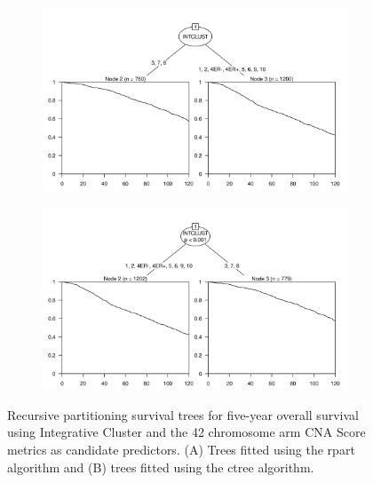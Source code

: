 \begin{figure}[!htb]
\centering

\vspace{0.5cm}

\begin{subfigure}{\textwidth}
\subcaption{}
\includegraphics[width=1\textwidth]{../figures/Appendices/Appendix_B/PA_PartyKit_Survival_Score_TenYearOS_INTCLUST.png}
\end{subfigure}

\vspace{2cm}

\begin{subfigure}{\textwidth}
\subcaption{}
\includegraphics[width=1\textwidth]{../figures/Appendices/Appendix_B/PA_Ctree_Survival_Score_TenYearOS_INTCLUST.png}
\end{subfigure}

\vspace{0.5cm}

\caption[Recursive partitioning survival trees for five-year overall survival using Integrative Cluster and the 42 chromosome arm CNA Score metrics as candidate predictors.]{Recursive partitioning survival trees for five-year overall survival using  Integrative Cluster and the 42 chromosome arm CNA Score metrics as candidate predictors. (A) Trees fitted using the rpart algorithm and (B) trees fitted using the ctree algorithm.}
\end{figure}

